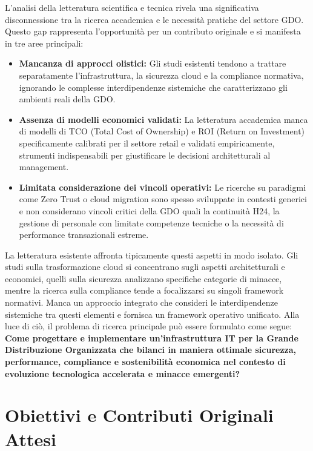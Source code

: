 L'analisi della letteratura scientifica e tecnica rivela una significativa disconnessione tra la ricerca accademica e le necessità pratiche del settore GDO. Questo gap rappresenta l'opportunità per un contributo originale e si manifesta in tre aree principali:
\begin{itemize}
\item \textbf{Mancanza di approcci olistici:} Gli studi esistenti tendono a trattare separatamente l'infrastruttura, la sicurezza cloud e la compliance normativa, ignorando le complesse interdipendenze sistemiche che caratterizzano gli ambienti reali della GDO.
\item \textbf{Assenza di modelli economici validati:} La letteratura accademica manca di modelli di TCO (Total Cost of Ownership) e ROI (Return on Investment) specificamente calibrati per il settore retail e validati empiricamente, strumenti indispensabili per giustificare le decisioni architetturali al management.
\item \textbf{Limitata considerazione dei vincoli operativi: }Le ricerche su paradigmi come Zero Trust o cloud migration sono spesso sviluppate in contesti generici e non considerano vincoli critici della GDO quali la continuità H24, la gestione di personale con limitate competenze tecniche o la necessità di performance transazionali estreme.

\end{itemize}
La letteratura esistente affronta tipicamente questi aspetti in modo isolato. Gli studi sulla trasformazione cloud si concentrano sugli aspetti architetturali e economici\autocite{forrester2024cloud}, quelli sulla sicurezza analizzano specifiche categorie di minacce\autocite{ponemon2024}, mentre la ricerca sulla compliance tende a focalizzarsi su singoli framework normativi. Manca un approccio integrato che consideri le interdipendenze sistemiche tra questi elementi e fornisca un framework operativo unificato.
Alla luce di ciò, il problema di ricerca principale può essere formulato come segue:
\textbf{Come progettare e implementare un'infrastruttura IT per la Grande Distribuzione Organizzata che bilanci in maniera ottimale sicurezza, performance, compliance e sostenibilità economica nel contesto di evoluzione tecnologica accelerata e minacce emergenti? }

\section{Obiettivi e Contributi Originali Attesi}
